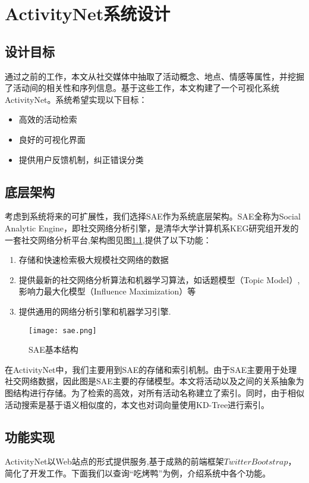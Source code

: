\chapter{ActivityNet系统设计}

\section{设计目标}
通过之前的工作，本文从社交媒体中抽取了活动概念、地点、情感等属性，并挖掘了活动间的相关性和序列信息。基于这些工作，本文构建了一个可视化系统ActivityNet。系统希望实现以下目标：
\begin{itemize}
\item 高效的活动检索
\item 良好的可视化界面
\item 提供用户反馈机制，纠正错误分类
\end{itemize}

\section{底层架构}
考虑到系统将来的可扩展性，我们选择SAE作为系统底层架构。SAE全称为Social Analytic Engine，即社交网络分析引擎，是清华大学计算机系KEG研究组开发的一套社交网络分析平台,架构图见图\ref{fig:sae_arch},提供了以下功能：
\begin{enumerate}
\item 存储和快速检索极大规模社交网络的数据
\item 提供最新的社交网络分析算法和机器学习算法，如话题模型（Topic Model）, 影响力最大化模型（Influence Maximization）等
\item 提供通用的网络分析引擎和机器学习引擎.
\end{enumerate}

\begin{figure}[!h]
\centering
\texttt{[image: sae.png]}
\caption{SAE基本结构}
\label{fig:sae_arch}
\end{figure}

在ActivityNet中，我们主要用到SAE的存储和索引机制。由于SAE主要用于处理社交网络数据，因此图是SAE主要的存储模型。本文将活动以及之间的关系抽象为图结构进行存储。为了检索的高效，对所有活动名称建立了索引。同时，由于相似活动搜索是基于语义相似度的，本文也对词向量使用KD-Tree进行索引。

\section{功能实现}
ActivityNet以Web站点的形式提供服务,基于成熟的前端框架$Twitter Bootstrap$，简化了开发工作。下面我们以查询``吃烤鸭''为例，介绍系统中各个功能。

